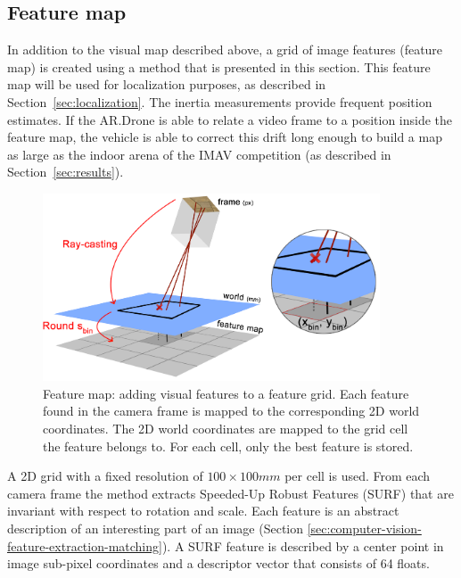 		\subsection{Feature map}
\label{sec:feature_map}
In addition to the visual map described above, a grid of image features (feature map) is created using a method that is presented in this section.
This feature map will be used for localization purposes, as described in Section~\ref{sec:localization}.
The inertia measurements provide frequent position estimates.
If the AR.Drone is able to relate a video frame to a position inside the feature map, the vehicle is able to correct this drift long enough to build a map 
as large as the indoor arena of the IMAV competition (as described in Section~\ref{sec:results}).

\begin{figure}[htb]
\centering
\includegraphics[width=10cm]{images/mapping3.png}
\caption{Feature map: adding visual features to a feature grid. Each feature found in the camera frame is mapped to the corresponding 2D world coordinates. The 2D world coordinates are mapped to the grid cell the feature belongs to. For each cell, only the best feature is stored.}
\label{fig:mapping3}
\end{figure}

A 2D grid with a fixed resolution of $100 \times 100mm$ per cell is used.
From each camera frame the method extracts Speeded-Up Robust Features (SURF) \cite{Bay2008cviu} that are invariant with respect to rotation and scale.
Each feature is an abstract description of an interesting part of an image (Section \ref{sec:computer-vision-feature-extraction-matching}).
A SURF feature is described by a center point in image sub-pixel coordinates and a descriptor vector that consists of 64 floats.

